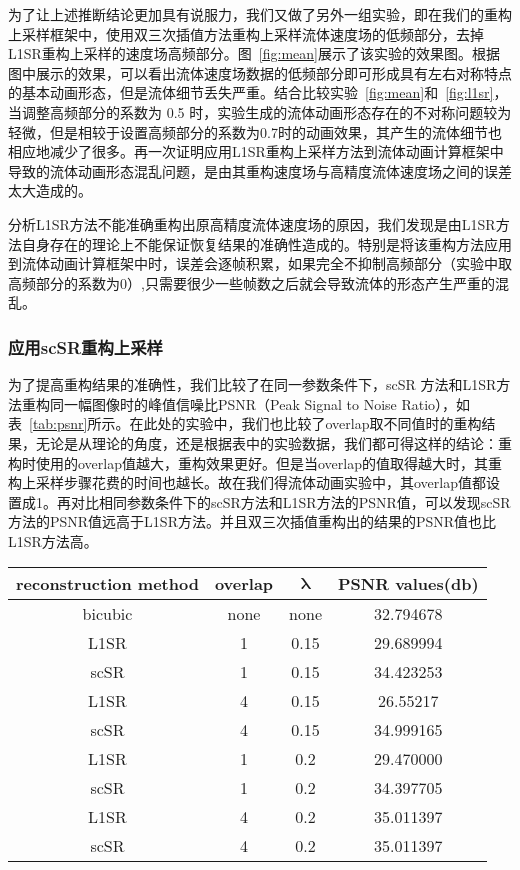 为了让上述推断结论更加具有说服力，我们又做了另外一组实验，即在我们的重构上采样框架中，使用双三次插值方法重构上采样流体速度场的低频部分，去掉L1SR重构上采样的速度场高频部分。图~\ref{fig:mean}展示了该实验的效果图。根据图中展示的效果，可以看出流体速度场数据的低频部分即可形成具有左右对称特点的基本动画形态，但是流体细节丢失严重。结合比较实验~\ref{fig:mean}和~\ref{fig:l1sr}，当调整高频部分的系数为 0.5 时，实验生成的流体动画形态存在的不对称问题较为轻微，但是相较于设置高频部分的系数为0.7时的动画效果，其产生的流体细节也相应地减少了很多。再一次证明应用L1SR重构上采样方法到流体动画计算框架中导致的流体动画形态混乱问题，是由其重构速度场与高精度流体速度场之间的误差太大造成的。

分析L1SR方法不能准确重构出原高精度流体速度场的原因，我们发现是由L1SR方法自身存在的理论上不能保证恢复结果的准确性造成的。特别是将该重构方法应用到流体动画计算框架中时，误差会逐帧积累，如果完全不抑制高频部分（实验中取高频部分的系数为0）,只需要很少一些帧数之后就会导致流体的形态产生严重的混乱。

\subsubsection{应用scSR重构上采样}

为了提高重构结果的准确性，我们比较了在同一参数条件下，scSR 方法和L1SR方法重构同一幅图像时的峰值信噪比PSNR（Peak Signal to Noise Ratio），如表~\ref{tab:psnr}所示。在此处的实验中，我们也比较了overlap取不同值时的重构结果，无论是从理论的角度，还是根据表中的实验数据，我们都可得这样的结论：重构时使用的overlap值越大，重构效果更好。但是当overlap的值取得越大时，其重构上采样步骤花费的时间也越长。故在我们得流体动画实验中，其overlap值都设置成1。再对比相同参数条件下的scSR方法和L1SR方法的PSNR值，可以发现scSR方法的PSNR值远高于L1SR方法。并且双三次插值重构出的结果的PSNR值也比L1SR方法高。

\begin{table}
  \centering
 \begin{tabular}{|c|c|c|c|} %
 \hline %
 \textbf{reconstruction method} & \textbf{overlap} & $\boldsymbol \lambda$ & \textbf{PSNR values(db)} \\
 \hline
bicubic  &  none & none & 32.794678 \\
 \hline
L1SR   & 1 & 0.15 &  29.689994 \\
scSR &1 &  0.15 & 34.423253 \\
 \hline
L1SR & 4 & 0.15 &  26.55217 \\
scSR &4 &  0.15 &  34.999165\\
 \hline
L1SR   & 1 & 0.2 &  29.470000 \\
scSR &1 &  0.2 & 34.397705 \\
 \hline
L1SR & 4 & 0.2 &  35.011397 \\
scSR &4 &  0.2 &  35.011397\\
\hline
\end{tabular}
\end{table}


